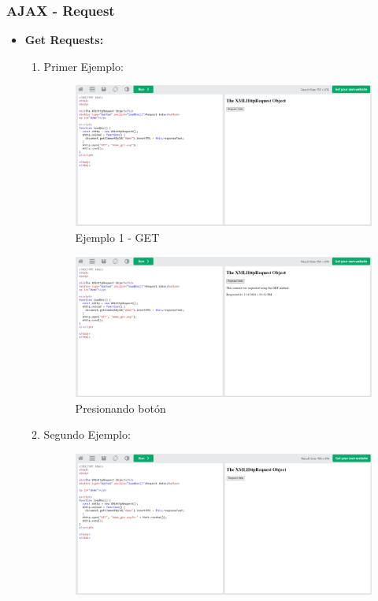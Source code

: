 \documentclass{article}
\begin{document}
	\subsubsection{AJAX - Request}
	\begin{itemize}
		\item \textbf{Get Requests:}
		\begin{enumerate}
			\item  Primer Ejemplo:
			\begin{figure}[H]
				\centering
				\includegraphics[width=1\textwidth,keepaspectratio]{img/ejemplo4}
				\caption{Ejemplo 1 - GET}
			\end{figure}
			\newpage
			\begin{figure}[H]
				\centering
				\includegraphics[width=1\textwidth,keepaspectratio]{img/boton4.png}
				\caption{Presionando botón}
			\end{figure}
			\item Segundo Ejemplo:
			\begin{figure}[H]
				\centering
				\includegraphics[width=1\textwidth,keepaspectratio]{img/ejemplo5.png}

\end{figure}
\end{enumerate}
\end{itemize}
\end{document}
